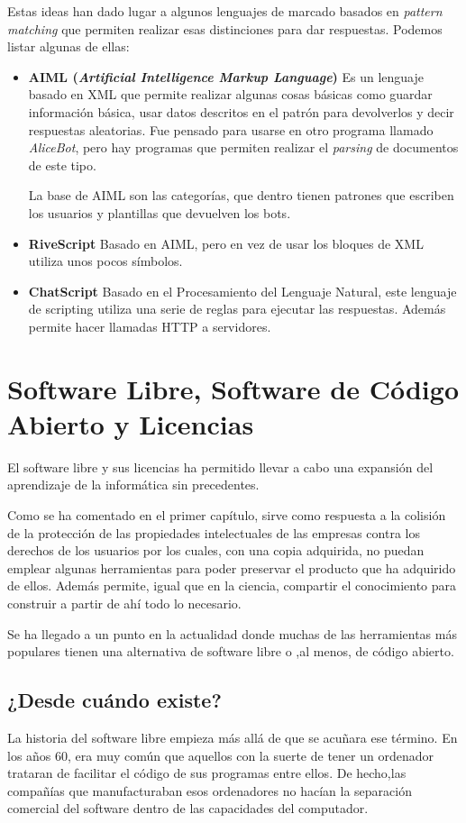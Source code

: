 Estas ideas han dado lugar a algunos lenguajes de marcado basados en \textit{pattern matching} que permiten realizar esas distinciones para dar respuestas. Podemos listar algunas de ellas:
\begin{itemize}
	\item \textbf{AIML (\textit{Artificial Intelligence Markup Language})} Es un lenguaje basado en XML que permite realizar algunas cosas básicas como guardar información básica, usar datos descritos en el patrón para devolverlos y decir respuestas aleatorias. Fue pensado para usarse en otro programa llamado \textit{AliceBot}, pero hay programas que permiten realizar el \textit{parsing} de documentos de este tipo.
	
	La base de AIML son las categorías, que dentro tienen patrones que escriben los usuarios y plantillas que devuelven los bots.
	
	\item \textbf{RiveScript} Basado en AIML, pero en vez de usar los bloques de XML utiliza unos pocos símbolos.
	
	\item \textbf{ChatScript} Basado en el Procesamiento del Lenguaje Natural, este lenguaje de scripting utiliza una serie de reglas para ejecutar las respuestas. Además permite hacer llamadas HTTP a servidores.
\end{itemize}

\section{Software Libre, Software de Código Abierto y Licencias}
El software libre y sus licencias \cite{gplv3} ha permitido llevar a cabo una expansión del aprendizaje de la informática sin precedentes. 

Como se ha comentado en el primer capítulo, sirve como respuesta a la colisión de la protección de las propiedades intelectuales de las empresas contra los derechos de los usuarios por los cuales, con una copia adquirida, no puedan emplear algunas herramientas para poder preservar el producto que ha adquirido de ellos. Además permite, igual que en la ciencia, compartir el conocimiento para construir a partir de ahí todo lo necesario.

Se ha llegado a un punto en la actualidad donde muchas de las herramientas más populares tienen una alternativa de software libre o ,al menos, de código abierto.

\subsection{¿Desde cuándo existe?}
La historia del software libre empieza más allá de que se acuñara ese término. En los años 60, era muy común que aquellos con la suerte de tener un ordenador trataran de facilitar el código de sus programas entre ellos. De hecho,las compañías que manufacturaban esos ordenadores no hacían la separación comercial del software dentro de las capacidades del computador.


